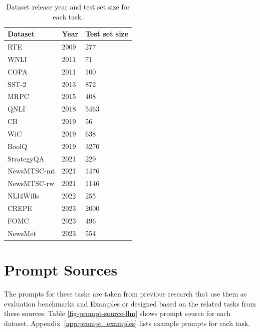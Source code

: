 \documentclass[letterpaper]{article} %
\begin{document}
\begin{table}[h!]
\centering \small
\begin{tabular}{l||ll}
Dataset & Year  & Test set size\\ \hline \hline
RTE & 2009  & 277 \\
WNLI & 2011 & 71\\
COPA & 2011  & 100\\
SST-2 & 2013 & 872\\
MRPC & 2015  & 408 \\
QNLI & 2018  & 5463\\
CB &  2019 & 56\\
WiC & 2019  & 638\\
BoolQ &  2019 & 3270\\
\hline \hline
StrategyQA &  2021  & 229\\
NewsMTSC-mt & 2021 & 1476\\
NewsMTSC-rw & 2021 & 1146\\
NLI4Wills & 2022 & 255\\
CREPE & 2023 & 2000 \\
FOMC & 2023 &496\\
NewsMet& 2023 &554

\end{tabular}
\caption[]{Dataset release year and test set size for each task.}
\label{tab-size-year-llm}
\end{table}

\section{Prompt Sources}
The prompts for these tasks are taken from previous research \cite{Bang2023, Qin2023} that use them as evaluation benchmarks and \citet{openai2023b} Examples or designed based on the related tasks from these sources. Table \ref{fig-prompt-source-llm} shows prompt source for each dataset.  Appendix~\ref{app:prompt_examples} lists example prompts for each task.
\end{document}
